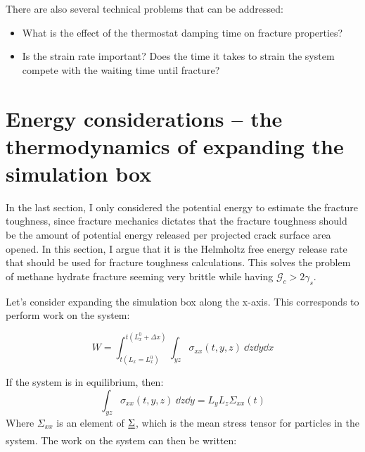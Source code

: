 There are also several technical problems that can be addressed:
\begin{itemize}
\item What is the effect of the thermostat damping time on fracture properties?
\item Is the strain rate important? Does the time it takes to strain the system compete with the waiting time until fracture?
\end{itemize}


\section{Energy considerations -- the thermodynamics of expanding the simulation box}
In the last section, I only considered the potential energy to estimate the fracture toughness, since fracture mechanics dictates that the fracture toughness should be the amount of potential energy released per projected crack surface area opened. In this section, I argue that it is the Helmholtz free energy release rate that should be used for fracture toughness calculations. This solves the problem of methane hydrate fracture seeming very brittle while having $\mathcal{G}_c > 2\gamma_s$.

Let's consider expanding the simulation box along the x-axis. This corresponds to perform work on the system:

\begin{equation}
	W = \int_{t(L_x = L_x^0)}^{t(L_x^0 + \Delta x)} \int_{yz} \sigma_{xx} (t, y, z) \ \dd z \dd y \dd x
\end{equation}

If the system is in equilibrium, then:
\begin{equation}
\int_{yz} \sigma_{xx} (t, y, z) \ \dd z \dd y = L_yL_z\Sigma_{xx}(t)	
\end{equation}
Where $\Sigma_{xx}$ is an element of $\uuline \Sigma$, which is the mean stress tensor for particles in the system. The work on the system can then be written:

